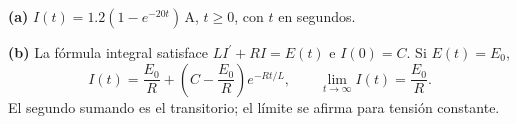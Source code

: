 \noindent\textbf{(a)} $I(t)=1.2(1-e^{-20t})\,\mathrm A$, $t\ge0$, con $t$ en segundos.

\noindent\textbf{(b)} La fórmula integral satisface $LI^{\prime}+RI=E(t)$ e $I(0)=C$. Si $E(t)=E_0$, \[I(t)=\frac{E_0}{R}+\left(C-\frac{E_0}{R}\right)e^{-Rt/L},\qquad \lim_{t\to\infty}I(t)=\frac{E_0}{R}.\] El segundo sumando es el transitorio; el límite se afirma para tensión constante.
